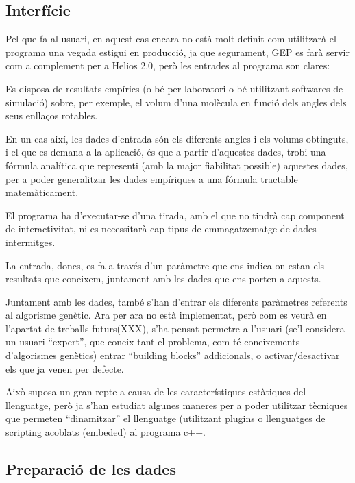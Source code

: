 \documentclass[titlepage,a4paper,12pt]{book}
\begin{document}
\subsection{Interfície} %
\label{sub:Interficie}

Pel que fa al usuari, en aquest cas encara no està molt definit com utilitzarà
el programa una vegada estigui en producció, ja que segurament, GEP es farà
servir com a complement per a Helios 2.0, però les entrades al programa son
clares:

Es disposa de resultats empírics (o bé per laboratori o bé utilitzant softwares
de simulació) sobre, per exemple, el volum d'una molècula en funció dels angles
dels seus enllaços rotables.

En un cas així, les dades d'entrada són els diferents angles i els volums
obtinguts, i el que es demana a la aplicació, és que a partir d'aquestes dades,
trobi una fórmula analítica que representi (amb la major fiabilitat possible)
aquestes dades, per a poder generalitzar les dades empíriques a una fórmula
tractable matemàticament.

El programa ha d'executar-se d'una tirada, amb el que no tindrà cap component de
interactivitat, ni es necessitarà cap tipus de emmagatzematge de dades
intermitges.

La entrada, doncs, es fa a través d'un paràmetre que ens indica on estan els
resultats que coneixem, juntament amb les dades que ens porten a aquests.

Juntament amb les dades, també s'han d'entrar els diferents paràmetres referents
al algorisme genètic.  Ara per ara no està implementat, però com es veurà en
l'apartat de treballs futurs(XXX), s'ha pensat permetre a l'usuari (se'l
considera un usuari ``expert'', que coneix tant el problema, com té coneixements
d'algorismes genètics) entrar ``building blocks'' addicionals, o
activar/desactivar els que ja venen per defecte.

Això suposa un gran repte a causa de les característiques estàtiques del
llenguatge, però ja s'han estudiat algunes maneres per a poder utilitzar
tècniques que permeten ``dinamitzar'' el llenguatge (utilitzant plugins o
llenguatges de scripting acoblats (embeded) al programa c++.


\subsection{Preparació de les dades} %
\label{sub:GPreparacio de dades}
\end{document}
